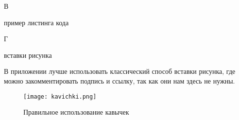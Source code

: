 \documentclass{report}
\begin{document}
\begin{flushright}
      В
\end{flushright}

\begin{center}   пример листинга кода \end{center}




\newpage


\begin{flushright}
      Г
\end{flushright}

\begin{center}   вставки рисунка \end{center}

В приложении лучше использовать классический способ вставки рисунка, где можно закомментировать подпись и ссылку, так как они нам здесь не нужны.

\begin{figure}[H]
\centering
    \texttt{[image: kavichki.png]}
    \captionsetup{justification=centering, format=plain}
    \caption{Правильное использование кавычек} %
    \label{fig:pic21}
\end{figure}
\end{document}
